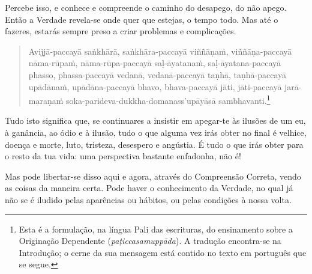 Percebe isso, e conhece e compreende o caminho do desapego, do não apego. Então
a Verdade revela-se onde quer que estejas, o tempo todo. Mas até o fazeres,
estarás sempre preso a criar problemas e complicações.

\begin{quote}
  \raggedright
  Avijjā-paccayā saṅkhārā,
  saṅkhāra-paccayā viññāṇaṁ,
  viññāṇa-paccayā nāma-rūpaṁ,
  nāma-rūpa-paccayā saḷ-āyatanaṁ,
  saḷ-āyatana-paccayā phasso,
  phassa-paccayā vedanā,
  vedanā-paccayā taṇhā,
  taṇhā-paccayā upādānaṁ,
  upādāna-paccayā bhavo,
  bhava-paccayā jāti,
  jāti-paccayā jarā-maraṇaṁ soka-parideva-dukkha-domanass'upāyāsā sambhavanti.\footnote{Esta é a formulação, na língua Pali das escrituras, do ensinamento sobre a Originação Dependente (\emph{paṭiccasamuppāda}). A tradução encontra-se na Introdução; o cerne da sua mensagem está contido no texto em português que se segue.}
\end{quote}

Tudo isto significa que, se continuares a insistir em apegar-te às ilusões de
um eu, à ganância, ao ódio e à ilusão, tudo o que alguma vez irás obter no final
é velhice, doença e morte, luto, tristeza, desespero e angústia. É tudo o que
irás obter para o resto da tua vida: uma perspectiva bastante enfadonha, não é!

Mas pode libertar-se disso aqui e agora, através do Compreensão Correta, vendo
as coisas da maneira certa. Pode haver o conhecimento da Verdade, no qual já não
se é iludido pelas aparências ou hábitos, ou pelas condições à nossa volta.



